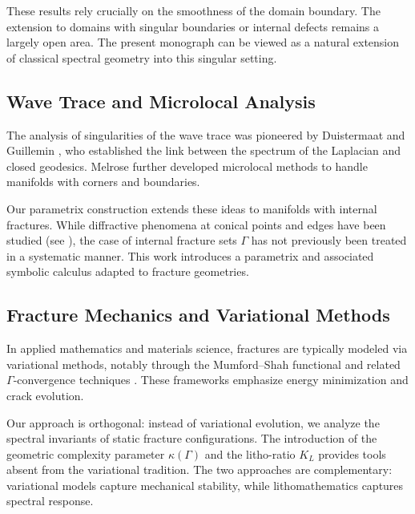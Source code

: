 These results rely crucially on the smoothness of the domain boundary. The
extension to domains with singular boundaries or internal defects remains a
largely open area. The present monograph can be viewed as a natural extension
of classical spectral geometry into this singular setting.

\subsection{Wave Trace and Microlocal Analysis}

The analysis of singularities of the wave trace was pioneered by Duistermaat
and Guillemin \cite{DG1975}, who established the link between the spectrum of
the Laplacian and closed geodesics. Melrose \cite{Melrose1980,Melrose1994}
further developed microlocal methods to handle manifolds with corners and
boundaries.

Our parametrix construction extends these ideas to manifolds with internal
fractures. While diffractive phenomena at conical points and edges have been
studied (see \cite{Cheeger1983,BruningSeeley1988}), the case of internal
fracture sets $\Gamma$ has not previously been treated in a systematic manner.
This work introduces a parametrix and associated symbolic calculus adapted to
fracture geometries.

\subsection{Fracture Mechanics and Variational Methods}

In applied mathematics and materials science, fractures are typically modeled
via variational methods, notably through the Mumford--Shah functional and
related $\Gamma$-convergence techniques
\cite{MumfordShah1989,Ambrosio1997,FrancfortMarigo1998}.
These frameworks emphasize energy minimization and crack evolution.

Our approach is orthogonal: instead of variational evolution, we analyze the
spectral invariants of static fracture configurations. The introduction of the
geometric complexity parameter $\kappa(\Gamma)$ and the litho-ratio $K_L$
provides tools absent from the variational tradition. The two approaches are
complementary: variational models capture mechanical stability, while
lithomathematics captures spectral response.

